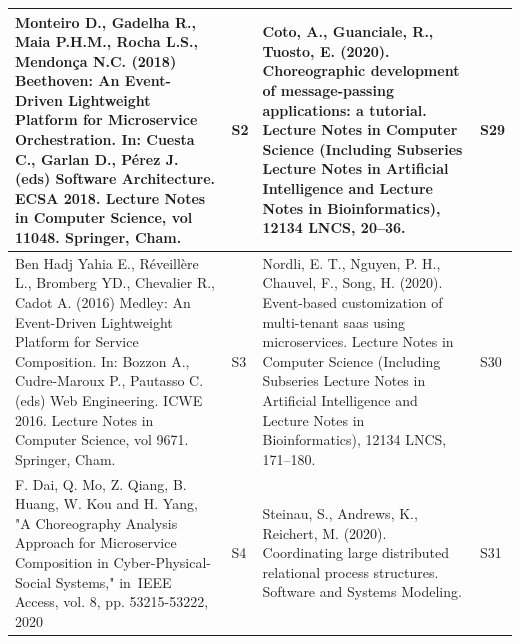 \documentclass{article}
\begin{document}
\begin{appendices}
\begin{table}
\begin{center}
\begin{tabular}{ | m{20em} | m{1cm}| m{20em} | m{1cm} | }
\textcolor[rgb]{0.2,0.2,0.2}{Monteiro D., Gadelha R., Maia P.H.M., Rocha L.S., Mendonça N.C. (2018) Beethoven: An Event-Driven Lightweight Platform for Microservice Orchestration. In: Cuesta C., Garlan D., Pérez J. (eds) Software Architecture. ECSA 2018. Lecture Notes in Computer Science, vol 11048. Springer, Cham.}                             & S2             & Coto, A., Guanciale, R.,  Tuosto, E. (2020). Choreographic development of message-passing applications: a tutorial. Lecture Notes in Computer Science (Including Subseries Lecture Notes in Artificial Intelligence and Lecture Notes in Bioinformatics), 12134 LNCS, 20–36.                                                                                                                                                   & S29             \\ 
\hline
\textcolor[rgb]{0.2,0.2,0.2}{Ben Hadj Yahia E., Réveillère L., Bromberg YD., Chevalier R., Cadot A. (2016) Medley: An Event-Driven Lightweight Platform for Service Composition. In: Bozzon A., Cudre-Maroux P., Pautasso C. (eds) Web Engineering. ICWE 2016. Lecture Notes in Computer Science, vol 9671. Springer, Cham.}                              & S3             & Nordli, E. T., Nguyen, P. H., Chauvel, F.,  Song, H. (2020). Event-based customization of multi-tenant saas using microservices. Lecture Notes in Computer Science (Including Subseries Lecture Notes in Artificial Intelligence and Lecture Notes in Bioinformatics), 12134 LNCS, 171–180.                                                                                                                                    & S30             \\ 
\hline
\textcolor[rgb]{0.2,0.2,0.2}{F. Dai, Q. Mo, Z. Qiang, B. Huang, W. Kou and H. Yang, "A Choreography Analysis Approach for Microservice Composition in Cyber-Physical-Social Systems," in~}\textcolor[rgb]{0.2,0.2,0.2}{IEEE Access}\textcolor[rgb]{0.2,0.2,0.2}{, vol. 8, pp. 53215-53222, 2020}                                                          & S4             & Steinau, S., Andrews, K.,  Reichert, M. (2020). Coordinating large distributed relational process structures. Software and Systems Modeling.                                                                                                                                                                                                                                                                                   & S31             \\ 
\hline

\end{tabular}
\end{center}
\end{table}
\end{appendices}
\end{document}
